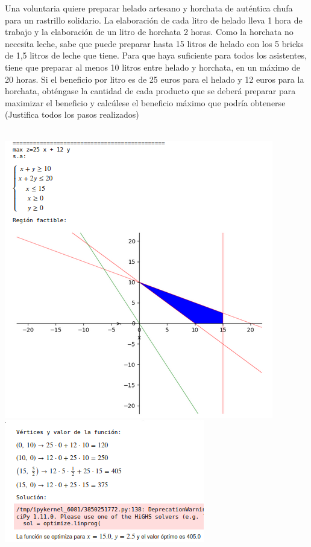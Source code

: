 \documentclass[addpoints,spanish, 12pt,a4paper]{exam}
\begin{document}
\begin{questions}
\question Una voluntaria quiere preparar helado artesano y horchata de
auténtica chufa para un rastrillo solidario. La elaboración de cada litro de helado lleva 1 hora
de trabajo y la elaboración de un litro de horchata 2 horas. Como la horchata no necesita leche,
sabe que puede preparar hasta 15 litros de helado con los 5 bricks de 1,5 litros de leche que tiene. Para que haya suficiente
para todos los asistentes, tiene que preparar al menos 10 litros entre helado y horchata, en un
máximo de 20 horas. Si el beneficio por litro es de 25 euros para el helado y 12 euros para la horchata, obténgase
la cantidad de cada producto que se deberá preparar para maximizar el beneficio y calcúlese
el beneficio máximo que podría obtenerse (Justifica todos los pasos realizados)
\begin{solution}\\
\includegraphics[scale=0.5]{prglin3}\\
\includegraphics[scale=0.8]{prglin4}
\end{solution}


\end{questions}
\end{document}
